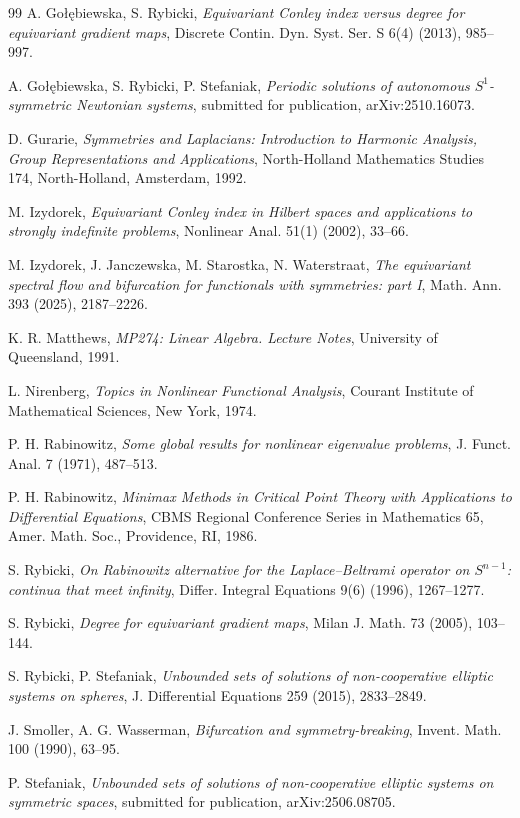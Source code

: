 \documentclass[reqno,twoside,12pt]{amsart}
\numberwithin{equation}{section} \errorcontextlines=0
\begin{document}
\begin{thebibliography}{99}
 A. Go{\l}\k{e}biewska, S. Rybicki, \emph{Equivariant Conley index versus degree for equivariant gradient maps}, Discrete Contin. Dyn. Syst. Ser. S 6(4) (2013), 985--997.

 A. Go{\l}\k{e}biewska, S. Rybicki, P. Stefaniak, \emph{Periodic solutions of autonomous $S^1$-symmetric Newtonian systems}, submitted for publication, arXiv:2510.16073.

 D. Gurarie, \emph{Symmetries and Laplacians: Introduction to Harmonic Analysis, Group Representations and Applications}, North-Holland Mathematics Studies 174, North-Holland, Amsterdam, 1992.

 M. Izydorek, \emph{Equivariant Conley index in Hilbert spaces and applications to strongly indefinite problems}, Nonlinear Anal.  51(1) (2002), 33--66.

 M. Izydorek, J. Janczewska, M. Starostka, N. Waterstraat, \emph{The equivariant spectral flow and bifurcation for functionals with symmetries: part I}, Math. Ann. 393 (2025), 2187--2226.

 K. R. Matthews, \emph{MP274: Linear Algebra. Lecture Notes}, University of Queensland, 1991.

 L. Nirenberg, \emph{Topics in Nonlinear Functional Analysis}, Courant Institute of Mathematical Sciences, New York, 1974.

 P. H. Rabinowitz, \emph{Some global results for nonlinear eigenvalue problems}, J. Funct. Anal. 7 (1971), 487--513.

 P. H. Rabinowitz, \emph{Minimax Methods in Critical Point Theory with Applications to Differential Equations}, CBMS Regional Conference Series in Mathematics 65, Amer. Math. Soc., Providence, RI, 1986.

 S. Rybicki, \emph{On Rabinowitz alternative for the Laplace--Beltrami operator on $S^{n-1}$: continua that meet infinity}, Differ. Integral Equations 9(6) (1996), 1267--1277.

 S. Rybicki, \emph{Degree for equivariant gradient maps}, Milan J. Math. 73 (2005), 103--144.

 S. Rybicki, P. Stefaniak, \emph{Unbounded sets of solutions of non-cooperative elliptic systems on spheres}, J. Differential Equations 259 (2015), 2833--2849.

 J. Smoller, A. G. Wasserman, \emph{Bifurcation and symmetry-breaking}, Invent. Math. 100 (1990), 63--95.

 P. Stefaniak, \emph{Unbounded sets of solutions of non-cooperative elliptic systems on symmetric spaces}, submitted for publication, arXiv:2506.08705.

\end{thebibliography}
\end{document}
